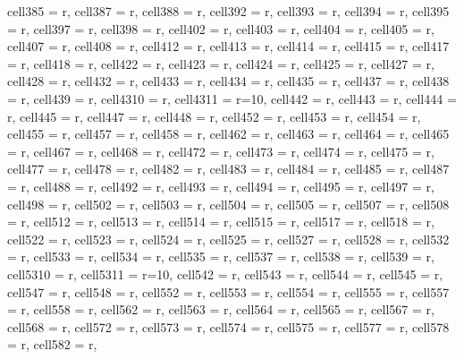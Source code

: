 \begin{longtblr}[
  caption = {Linear model estimating all the considered metrics in every alternative scenario.},
  label = {tab:appendix_LCBM_all_metrics_all_scenarios}
]
{  cell{38}{5} = {r},
  cell{38}{7} = {r},
  cell{38}{8} = {r},
  cell{39}{2} = {r},
  cell{39}{3} = {r},
  cell{39}{4} = {r},
  cell{39}{5} = {r},
  cell{39}{7} = {r},
  cell{39}{8} = {r},
  cell{40}{2} = {r},
  cell{40}{3} = {r},
  cell{40}{4} = {r},
  cell{40}{5} = {r},
  cell{40}{7} = {r},
  cell{40}{8} = {r},
  cell{41}{2} = {r},
  cell{41}{3} = {r},
  cell{41}{4} = {r},
  cell{41}{5} = {r},
  cell{41}{7} = {r},
  cell{41}{8} = {r},
  cell{42}{2} = {r},
  cell{42}{3} = {r},
  cell{42}{4} = {r},
  cell{42}{5} = {r},
  cell{42}{7} = {r},
  cell{42}{8} = {r},
  cell{43}{2} = {r},
  cell{43}{3} = {r},
  cell{43}{4} = {r},
  cell{43}{5} = {r},
  cell{43}{7} = {r},
  cell{43}{8} = {r},
  cell{43}{9} = {r},
  cell{43}{10} = {r},
  cell{43}{11} = {r=10}{},
  cell{44}{2} = {r},
  cell{44}{3} = {r},
  cell{44}{4} = {r},
  cell{44}{5} = {r},
  cell{44}{7} = {r},
  cell{44}{8} = {r},
  cell{45}{2} = {r},
  cell{45}{3} = {r},
  cell{45}{4} = {r},
  cell{45}{5} = {r},
  cell{45}{7} = {r},
  cell{45}{8} = {r},
  cell{46}{2} = {r},
  cell{46}{3} = {r},
  cell{46}{4} = {r},
  cell{46}{5} = {r},
  cell{46}{7} = {r},
  cell{46}{8} = {r},
  cell{47}{2} = {r},
  cell{47}{3} = {r},
  cell{47}{4} = {r},
  cell{47}{5} = {r},
  cell{47}{7} = {r},
  cell{47}{8} = {r},
  cell{48}{2} = {r},
  cell{48}{3} = {r},
  cell{48}{4} = {r},
  cell{48}{5} = {r},
  cell{48}{7} = {r},
  cell{48}{8} = {r},
  cell{49}{2} = {r},
  cell{49}{3} = {r},
  cell{49}{4} = {r},
  cell{49}{5} = {r},
  cell{49}{7} = {r},
  cell{49}{8} = {r},
  cell{50}{2} = {r},
  cell{50}{3} = {r},
  cell{50}{4} = {r},
  cell{50}{5} = {r},
  cell{50}{7} = {r},
  cell{50}{8} = {r},
  cell{51}{2} = {r},
  cell{51}{3} = {r},
  cell{51}{4} = {r},
  cell{51}{5} = {r},
  cell{51}{7} = {r},
  cell{51}{8} = {r},
  cell{52}{2} = {r},
  cell{52}{3} = {r},
  cell{52}{4} = {r},
  cell{52}{5} = {r},
  cell{52}{7} = {r},
  cell{52}{8} = {r},
  cell{53}{2} = {r},
  cell{53}{3} = {r},
  cell{53}{4} = {r},
  cell{53}{5} = {r},
  cell{53}{7} = {r},
  cell{53}{8} = {r},
  cell{53}{9} = {r},
  cell{53}{10} = {r},
  cell{53}{11} = {r=10}{},
  cell{54}{2} = {r},
  cell{54}{3} = {r},
  cell{54}{4} = {r},
  cell{54}{5} = {r},
  cell{54}{7} = {r},
  cell{54}{8} = {r},
  cell{55}{2} = {r},
  cell{55}{3} = {r},
  cell{55}{4} = {r},
  cell{55}{5} = {r},
  cell{55}{7} = {r},
  cell{55}{8} = {r},
  cell{56}{2} = {r},
  cell{56}{3} = {r},
  cell{56}{4} = {r},
  cell{56}{5} = {r},
  cell{56}{7} = {r},
  cell{56}{8} = {r},
  cell{57}{2} = {r},
  cell{57}{3} = {r},
  cell{57}{4} = {r},
  cell{57}{5} = {r},
  cell{57}{7} = {r},
  cell{57}{8} = {r},
  cell{58}{2} = {r},
}
\end{longtblr}
